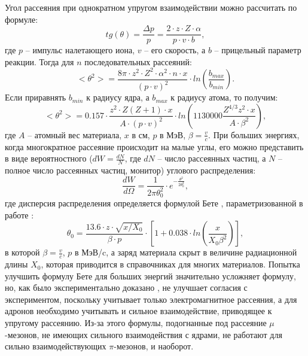 \documentclass[a4paper,12pt]{article}
\begin{document}
\begin{large}
 Угол рассеяния при однократном упругом взаимодействии можно рассчитать по формуле:
  \begin{equation}
  \label{CoulombOneScat}
  tg(\theta)=\frac{\Delta p}{p}=\frac{2\cdot z\cdot Z\cdot\alpha}{p\cdot v\cdot b},
  \end{equation}
  где $p$ -- импульс налетающего иона, $v$ -- его скорость, а $b$ -- прицельный параметр реакции.
  Тогда для $n$ последовательных рассеяний:
  \begin{equation}
  \label{CoulombMultScat}
  <\theta^2>=\frac{8\pi\cdot z^2\cdot Z^2\cdot\alpha^2\cdot n\cdot x}{(p\cdot v)^2}\cdot ln\left(\frac{b_{max}}{b_{min}}\right).
  \end{equation}
  Если приравнять $b_{min}$ к радиусу ядра, а $b_{max}$ к радиусу атома, то получим:
\begin{equation}
  \label{CoulombMultLE}
  <\theta^2>=0.157\cdot\frac{z^2\cdot Z(Z+1)\cdot x}{A\cdot(p\cdot v)^2}\cdot ln\left(1130000\frac{Z^{4/3}z^2\cdot x}{A\cdot \beta^2}\right),
\end{equation}
  где $A$ -- атомный вес материала, $x$ в см, $p$ в МэВ, $\beta=\frac{v}{c}$.
  При больших энергиях, когда многократное рассеяние происходит на малые углы, его можно представить в виде вероятностного ($dW=\frac{dN}{N}$, где $dN$ -- число рассеянных частиц, а $N$ -- полное число рассеянных частиц, монитор) углового распределения:
\begin{equation}
  \label{GaussMultHE}
  \frac{dW}{d\Omega}=\frac{1}{2\pi\theta_0^2}\cdot e^{-\frac{\theta^2}{2\theta_0^2}},
\end{equation}
  где дисперсия распределения определяется формулой Бете \cite{Bethe}, параметризованной в работе \cite{Lynch91}:
\begin{equation}
  \label{T0MultHE}
  \theta_0=
  \frac{13.6\cdot z\cdot\sqrt{x/X_0}}{\beta\cdot p}\cdot\left[ 1+0.038\cdot ln\left( \frac{x}{X_0\beta^2}\right)\right],
\end{equation}
в которой $\beta=\frac{v}{c}$, $p$ в МэВ/c, а заряд материала скрыт в величине радиационной длины $X_0$, которая приводится в справочниках для многих материалов.
  Попытка \cite{Scott} улучшить формулу Бете для больших энергий значительно усложняет формулу, но, как было экспериментально доказано \cite{Shen}, не улучшает согласия с экспериментом, поскольку учитывает только электромагнитное рассеяния, а для адронов необходимо учитывать и сильное взаимодействие, приводящее к упругому рассеянию.
  Из-за этого формулы, подогнанные под рассеяние $\mu$-мезонов, не имеющих сильного взаимодействия с ядрами, не работают для сильно взаимодействующих $\pi$-мезонов, и наоборот.


\end{large}
\end{document}
